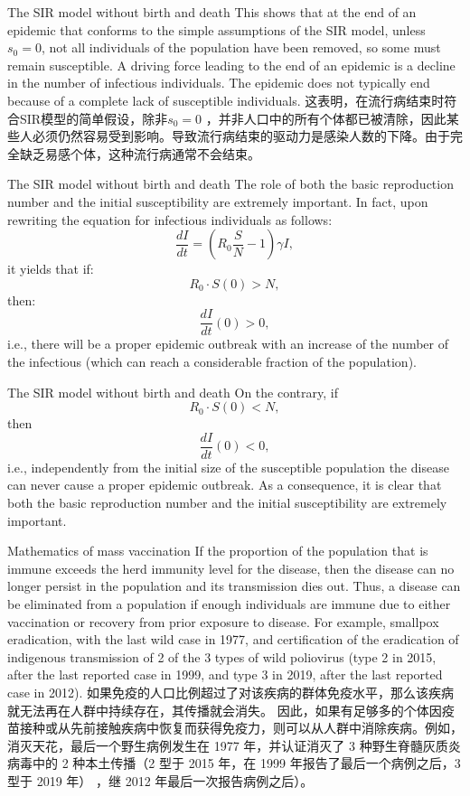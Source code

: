 \documentclass[
  notheorems,
  aspectratio=54,
]{beamer}
\begin{document}
\begin{frame}{The SIR model without birth and death}
  This shows that at the end of an epidemic that conforms to the simple assumptions of the SIR model, unless 
${\displaystyle s_{0}=0}$, not all individuals of the population have been removed, so some must remain susceptible. A driving force leading to the end of an epidemic is a decline in the number of infectious individuals. The epidemic does not typically end because of a complete lack of susceptible individuals.
这表明，在流行病结束时符合SIR模型的简单假设，除非${\displaystyle s_{0}=0}$ ，并非人口中的所有个体都已被清除，因此某些人必须仍然容易受到影响。导致流行病结束的驱动力是感染人数的下降。由于完全缺乏易感个体，这种流行病通常不会结束。
\end{frame}

\begin{frame}{The SIR model without birth and death}
  The role of both the basic reproduction number and the initial susceptibility are extremely important. In fact, upon rewriting the equation for infectious individuals as follows:
$${\displaystyle {\frac {dI}{dt}}=\left(R_{0}{\frac {S}{N}}-1\right)\gamma I,}$$
it yields that if:
$${\displaystyle R_{0}\cdot S(0)>N,}$$
then:
$${\displaystyle {\frac {dI}{dt}}(0)>0,}$$
i.e., there will be a proper epidemic outbreak with an increase of the number of the infectious (which can reach a considerable fraction of the population).
\end{frame}

\begin{frame}{The SIR model without birth and death}
  On the contrary, if
$${\displaystyle R_{0}\cdot S(0)<N,}$$
then
$${\displaystyle {\frac {dI}{dt}}(0)<0,}$$
i.e., independently from the initial size of the susceptible population the disease can never cause a proper epidemic outbreak. As a consequence, it is clear that both the basic reproduction number and the initial susceptibility are extremely important.


\end{frame}

\begin{frame}{Mathematics of mass vaccination}
  If the proportion of the population that is immune exceeds the herd immunity level for the disease, then the disease can no longer persist in the population and its transmission dies out. Thus, a disease can be eliminated from a population if enough individuals are immune due to either vaccination or recovery from prior exposure to disease. For example, smallpox eradication, with the last wild case in 1977, and certification of the eradication of indigenous transmission of 2 of the 3 types of wild poliovirus (type 2 in 2015, after the last reported case in 1999, and type 3 in 2019, after the last reported case in 2012). 如果免疫的人口比例超过了对该疾病的群体免疫水平，那么该疾病就无法再在人群中持续存在，其传播就会消失。 因此，如果有足够多的个体因疫苗接种或从先前接触疾病中恢复而获得免疫力，则可以从人群中消除疾病。例如，消灭天花，最后一个野生病例发生在 1977 年，并认证消灭了 3 种野生脊髓灰质炎病毒中的 2 种本土传播（2 型于 2015 年，在 1999 年报告了最后一个病例之后，3 型于 2019 年） ，继 2012 年最后一次报告病例之后）。
\end{frame}
\end{document}
